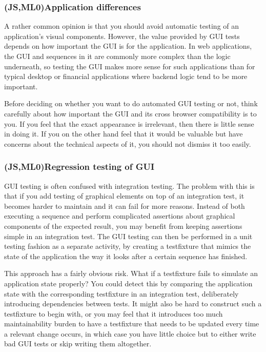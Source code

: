 \documentclass[11pt]{article}
\begin{document}
\subsubsection{(JS,ML0)Application differences}

A rather common opinion is that you should avoid automatic testing of an application's visual components. However, the value provided by GUI tests depends on how important the GUI is for the application. In web applications, the GUI and sequences in it are commonly more complex than the logic underneath, so testing the GUI makes more sense for such applications than for typical desktop or financial applications where backend logic tend to be more important. \cite[question~21]{Ahnve}

Before deciding on whether you want to do automated GUI testing or not, think carefully about how important the GUI and its cross browser compatibility is to you. If you feel that the exact appearance is irrelevant, then there is little sense in doing it. If you on the other hand feel that it would be valuable but have concerns about the technical aspects of it, you should not dismiss it too easily.

\subsubsection{(JS,ML0)Regression testing of GUI}

GUI testing is often confused with integration testing. The problem with this is that if you add testing of graphical elements on top of an integration test, it becomes harder to maintain and it can fail for more reasons. Instead of both executing a sequence and perform complicated assertions about graphical components of the expected result, you may benefit from keeping assertions simple in an integration test. The GUI testing can then be performed in a unit testing fashion as a separate activity, by creating a \gls{testfixture} that mimics the state of the application the way it looks after a certain sequence has finished.

This approach has a fairly obvious risk. What if a \gls{testfixture} fails to simulate an application state properly? You could detect this by comparing the application state with the corresponding \gls{testfixture} in an integration test, deliberately introducing dependencies between tests. It might also be hard to construct such a \gls{testfixture} to begin with, or you may feel that it introduces too much maintainability burden to have a \gls{testfixture} that needs to be updated every time a relevant change occurs, in which case you have little choice but to either write bad GUI tests or skip writing them altogether.
\end{document}
